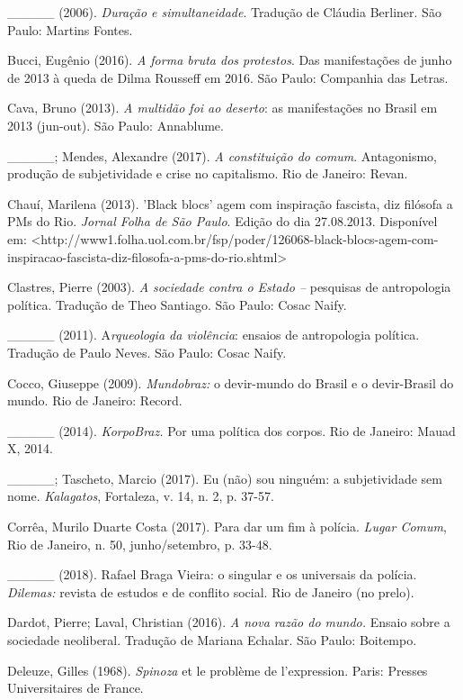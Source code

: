 \_\_\_\_\_ (2006). \emph{Duração e simultaneidade}. Tradução de Cláudia
Berliner. São Paulo: Martins Fontes.

Bucci, Eugênio (2016). \emph{A forma bruta dos protestos}. Das
manifestações de junho de 2013 à queda de Dilma Rousseff em 2016. São
Paulo: Companhia das Letras.

Cava, Bruno (2013). \emph{A multidão foi ao deserto}: as manifestações
no Brasil em 2013 (jun-out). São Paulo: Annablume.

\_\_\_\_\_; Mendes, Alexandre (2017). \emph{A constituição do comum}.
Antagonismo, produção de subjetividade e crise no capitalismo. Rio de
Janeiro: Revan.

Chauí, Marilena (2013). 'Black blocs' agem com inspiração fascista, diz
filósofa a PMs do Rio. \emph{Jornal Folha de São Paulo}. Edição do dia
27.08.2013. Disponível em:
\textless{}http://www1.folha.uol.com.br/fsp/poder/126068-black-blocs-agem-com-inspiracao-fascista-diz-filosofa-a-pms-do-rio.shtml\textgreater{}

Clastres, Pierre (2003). \emph{A sociedade contra o Estado --} pesquisas
de antropologia política. Tradução de Theo Santiago. São Paulo: Cosac
Naify.

\_\_\_\_\_ (2011). A\emph{rqueologia da violência}: ensaios de
antropologia política. Tradução de Paulo Neves. São Paulo: Cosac Naify.

Cocco, Giuseppe (2009). \emph{Mundobraz: }o devir-mundo do Brasil e o
devir-Brasil do mundo. Rio de Janeiro: Record.

\_\_\_\_\_ (2014). \emph{KorpoBraz.} Por uma política dos corpos. Rio de
Janeiro: Mauad X, 2014.

\_\_\_\_\_; Tascheto, Marcio (2017). Eu (não) sou ninguém: a
subjetividade sem nome. \emph{Kalagatos}, Fortaleza, v. 14, n. 2, p.
37-57.

Corrêa, Murilo Duarte Costa (2017). Para dar um fim à polícia.
\emph{Lugar Comum}, Rio de Janeiro, n. 50, junho/setembro, p. 33-48.

\_\_\_\_\_ (2018). Rafael Braga Vieira: o singular e os universais da
polícia.\emph{ Dilemas: }revista de estudos e de conflito social. Rio de
Janeiro (no prelo).

Dardot, Pierre; Laval, Christian (2016). \emph{A nova razão do mundo.
}Ensaio sobre a sociedade neoliberal. Tradução de Mariana Echalar. São
Paulo: Boitempo.

Deleuze, Gilles (1968). \emph{Spinoza} et le problème de l'expression.
Paris: Presses Universitaires de France.

